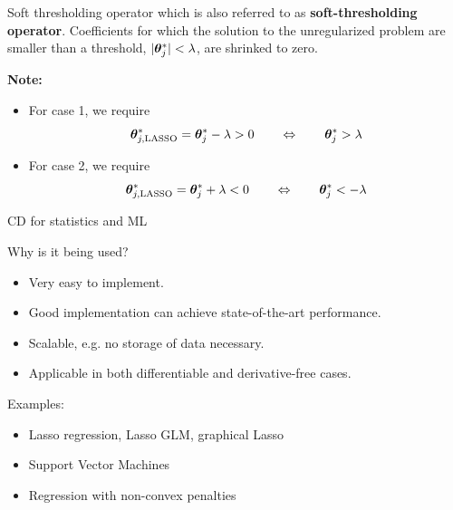 \documentclass[11pt,compress,t,notes=noshow, xcolor=table]{beamer}
\begin{document}
\begin{vbframe}{Soft thresholding operator}
which is also referred to as \textbf{soft-thresholding operator}. Coefficients for which the solution to the unregularized problem are smaller than a threshold, $|\bm{\theta}^\ast_j| < \lambda$, are shrinked to zero. 

\vspace*{0.2cm}

\begin{footnotesize}
\textbf{Note: }
\begin{itemize}
    \item For case 1, we require 
    $$
        \bm{\theta}^\ast_{j, \text{LASSO}} = \bm{\theta}^\ast_j - \lambda  > 0 \qquad \Leftrightarrow \qquad \bm{\theta}^\ast_j > \lambda 
    $$
    \item For case 2, we require
    $$
        \bm{\theta}^\ast_{j, \text{LASSO}} = \bm{\theta}^\ast_j + \lambda  < 0 \qquad \Leftrightarrow \qquad \bm{\theta}^\ast_j < - \lambda 
    $$
\end{itemize}
\end{footnotesize}

\end{vbframe}


\begin{vbframe}{CD for statistics and ML}

Why is it being used?

\begin{itemize}
\item Very easy to implement.
\item Good implementation can achieve state-of-the-art performance.
\item Scalable, e.g. no storage of data necessary.
\item Applicable in both differentiable and derivative-free cases.
\end{itemize}

\lz 

Examples:

\begin{itemize}
\item Lasso regression, Lasso GLM, graphical Lasso
\item Support Vector Machines
\item Regression with non-convex penalties
\end{itemize}




\end{vbframe}


\endlecture
\end{document}
